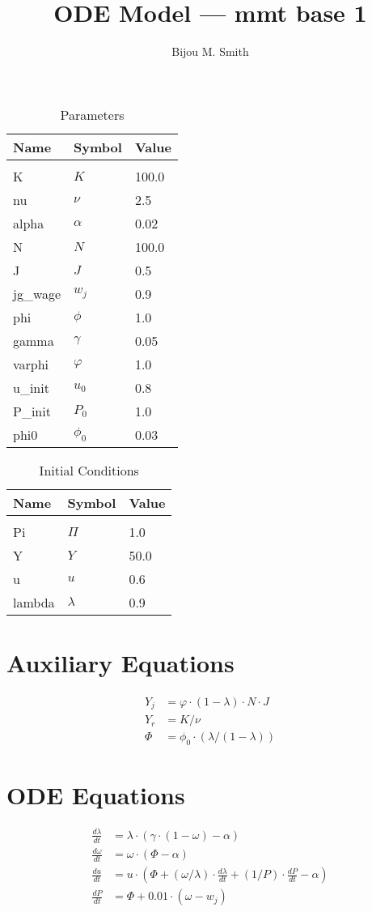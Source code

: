 \documentclass[12pt]{extarticle}
\author{Bijou M. Smith}
\title{ODE Model --- mmt base 1 }
\begin{document}
\maketitle
\begin{table}[h]
\centering
\caption{Parameters}
\begin{tabular}{lll}
Name & Symbol & Value \\ \hline  &  &  \\[-10pt] 
K & $K$ & 100.0 \\
nu & $\nu$ & 2.5 \\
alpha & $\alpha$ & 0.02 \\
N & $N$ & 100.0 \\
J & $J$ & 0.5 \\
jg\_wage & $w_j$ & 0.9 \\
phi & $\phi$ & 1.0 \\
gamma & $\gamma$ & 0.05 \\
varphi & $\varphi$ & 1.0 \\
u\_init & $u_0$ & 0.8 \\
P\_init & $P_0$ & 1.0 \\
phi0 & $\phi_0$ & 0.03
\end{tabular}
\end{table}
\begin{table}[h]
\centering
\caption{Initial Conditions}
\begin{tabular}{lll}
Name & Symbol & Value \\ \hline  &  &  \\[-10pt] 
Pi & $\Pi$ & 1.0 \\
Y & $Y$ & 50.0 \\
u & $u$ & 0.6 \\
lambda & $\lambda$ & 0.9
\end{tabular}
\end{table}
\section*{Auxiliary Equations}
\begin{align*}
Y_j &= \varphi  \cdot (1 - \lambda) \cdot N \cdot J \\
Y_r &= K / \nu \\
\Phi &= \phi_0  \cdot (\lambda / (1 - \lambda))
\end{align*}
\section*{ODE Equations}
\begin{align*}
\frac{d\lambda}{dt} &= \lambda  \cdot (\gamma  \cdot (1 - \omega) - \alpha) \\
\frac{d\omega}{dt} &= \omega  \cdot (\Phi - \alpha) \\
\frac{du}{dt} &= u  \cdot (\Phi + (\omega / \lambda) \cdot \frac{d\lambda}{dt} + (1/P) \cdot \frac{dP}{dt} - \alpha) \\
\frac{dP}{dt} &= \Phi + 0.01  \cdot (\omega - w_j)
\end{align*}
\end{document}

